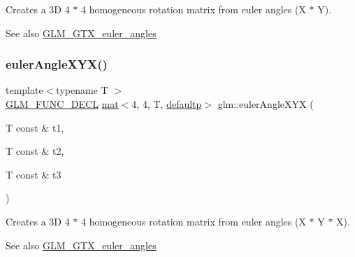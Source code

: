 Creates a 3D 4 $\ast$ 4 homogeneous rotation matrix from euler angles (X $\ast$ Y). \begin{DoxySeeAlso}{See also}
\hyperlink{group__gtx__euler__angles}{G\+L\+M\+\_\+\+G\+T\+X\+\_\+euler\+\_\+angles} 
\end{DoxySeeAlso}
\mbox{\label{group__gtx__euler__angles_ga29bd0787a28a6648159c0d6e69706066}} 
\subsubsection{\texorpdfstring{euler\+Angle\+X\+Y\+X()}{eulerAngleXYX()}}
{\footnotesize\ttfamily template$<$typename T $>$ \\
\hyperlink{setup_8hpp_ab2d052de21a70539923e9bcbf6e83a51}{G\+L\+M\+\_\+\+F\+U\+N\+C\+\_\+\+D\+E\+CL} \hyperlink{structglm_1_1mat}{mat}$<$4, 4, T, \hyperlink{namespaceglm_a36ed105b07c7746804d7fdc7cc90ff25a9d21ccd8b5a009ec7eb7677befc3bf51}{defaultp}$>$ glm\+::euler\+Angle\+X\+YX (\begin{DoxyParamCaption}\item[{T const \&}]{t1,  }\item[{T const \&}]{t2,  }\item[{T const \&}]{t3 }\end{DoxyParamCaption})}

Creates a 3D 4 $\ast$ 4 homogeneous rotation matrix from euler angles (X $\ast$ Y $\ast$ X). \begin{DoxySeeAlso}{See also}
\hyperlink{group__gtx__euler__angles}{G\+L\+M\+\_\+\+G\+T\+X\+\_\+euler\+\_\+angles} 
\end{DoxySeeAlso}
\mbox{\label{group__gtx__euler__angles_ga1975e0f0e9bed7f716dc9946da2ab645}} 
